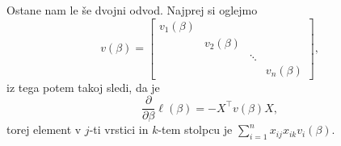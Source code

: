 \documentclass[12pt,a4paper]{amsart}
\theoremstyle{definition} %
\theoremstyle{plain} %
\begin{document}
Ostane nam le še dvojni odvod. Najprej si oglejmo
\[
    v(\beta) = \begin{bmatrix}
        v_{1}(\beta)  & & &\\
        & v_{2}(\beta) & & \\
        & & \ddots & \\
        & & & v_{n}(\beta)
    \end{bmatrix},
\]
iz tega potem takoj sledi, da je
\begin{equation} \label{drugi}
    \frac{\partial}{\partial \beta}\ell(\beta) = -X^\top v(\beta)X,
\end{equation}
torej element v $j$-ti vrstici in $k$-tem stolpcu je $\sum_{i=1}^{n}x_{ij}x_{ik}v_{i}(\beta).$
\end{document}
